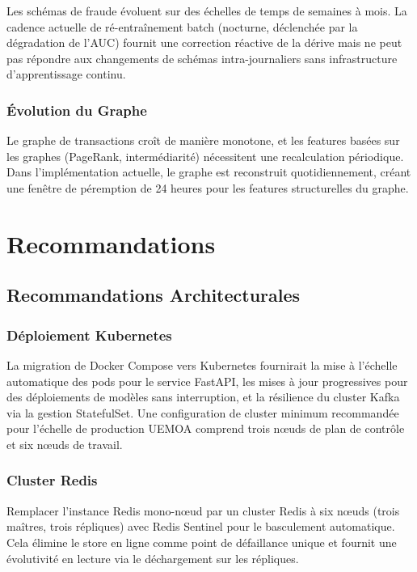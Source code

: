 \documentclass[12pt,a4paper,oneside]{book}
\theoremstyle{definition}
\theoremstyle{plain}
\begin{document}
Les schémas de fraude évoluent sur des échelles de temps de semaines à mois. La cadence actuelle de ré-entraînement batch (nocturne, déclenchée par la dégradation de l'AUC) fournit une correction réactive de la dérive mais ne peut pas répondre aux changements de schémas intra-journaliers sans infrastructure d'apprentissage continu.

\subsection{Évolution du Graphe}

Le graphe de transactions croît de manière monotone, et les features basées sur les graphes (PageRank, intermédiarité) nécessitent une recalculation périodique. Dans l'implémentation actuelle, le graphe est reconstruit quotidiennement, créant une fenêtre de péremption de 24 heures pour les features structurelles du graphe.

\chapter{Recommandations}
\label{chap:reco}

\section{Recommandations Architecturales}

\subsection{Déploiement Kubernetes}

La migration de Docker Compose vers Kubernetes fournirait la mise à l'échelle automatique des pods pour le service FastAPI, les mises à jour progressives pour des déploiements de modèles sans interruption, et la résilience du cluster Kafka via la gestion StatefulSet. Une configuration de cluster minimum recommandée pour l'échelle de production UEMOA comprend trois nœuds de plan de contrôle et six nœuds de travail.

\subsection{Cluster Redis}

Remplacer l'instance Redis mono-nœud par un cluster Redis à six nœuds (trois maîtres, trois répliques) avec Redis Sentinel pour le basculement automatique. Cela élimine le store en ligne comme point de défaillance unique et fournit une évolutivité en lecture via le déchargement sur les répliques.
\end{document}
